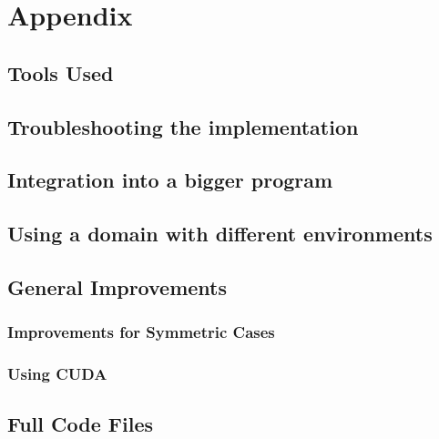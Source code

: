 
\chapter{Appendix} %

\label{AppendixA} %

\section{Tools Used}

\section{Troubleshooting the implementation}

\section{Integration into a bigger program}

\section{Using a domain with different environments}

\section{General Improvements}
\subsection{Improvements for Symmetric Cases}
\subsection{Using CUDA}


\section{Full Code Files}
